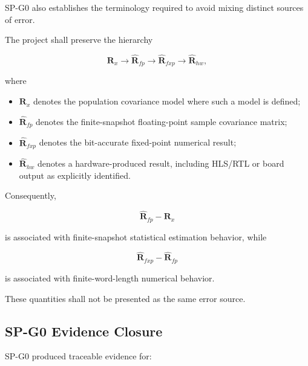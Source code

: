 SP-G0 also establishes the terminology required to avoid mixing distinct
sources of error.

The project shall preserve the hierarchy

\[
\mathbf R_x
\rightarrow
\widehat{\mathbf R}_{fp}
\rightarrow
\widehat{\mathbf R}_{fxp}
\rightarrow
\widehat{\mathbf R}_{hw},
\]

where

\begin{itemize}
    \item $\mathbf R_x$ denotes the population covariance model where such a
    model is defined;

    \item $\widehat{\mathbf R}_{fp}$ denotes the finite-snapshot
    floating-point sample covariance matrix;

    \item $\widehat{\mathbf R}_{fxp}$ denotes the bit-accurate fixed-point
    numerical result;

    \item $\widehat{\mathbf R}_{hw}$ denotes a hardware-produced result,
    including HLS/RTL or board output as explicitly identified.
\end{itemize}

Consequently,

\[
\widehat{\mathbf R}_{fp} - \mathbf R_x
\]

is associated with finite-snapshot statistical estimation behavior, while

\[
\widehat{\mathbf R}_{fxp}
-
\widehat{\mathbf R}_{fp}
\]

is associated with finite-word-length numerical behavior.

These quantities shall not be presented as the same error source.

\subsection{SP-G0 Evidence Closure}

SP-G0 produced traceable evidence for:

